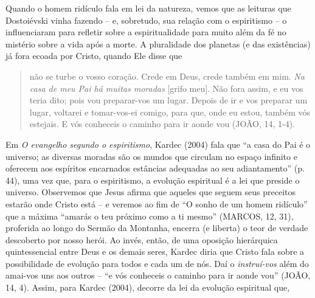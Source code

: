 Quando o homem ridículo fala em lei da natureza, vemos que as leituras
que Dostoiévski vinha fazendo -- e, sobretudo, sua relação com o
espiritismo -- o influenciaram para refletir sobre a espiritualidade
para muito além da fé no mistério sobre a vida após a morte. A
pluralidade dos planetas (e das existências) já fora ecoada por Cristo,
quando Ele disse que

\begin{quote}
não se turbe o vosso coração. Crede em Deus, crede também em mim.
\emph{Na casa de meu Pai há muitas moradas} {[}grifo meu{]}. Não fora
assim, e eu vos teria dito; pois vou preparar-vos um lugar. Depois de ir
e vos preparar um lugar, voltarei e tomar-vos-ei comigo, para que, onde
eu estou, também vós estejais. E vós conheceis o caminho para ir aonde
vou (JOÃO, 14, 1-4).
\end{quote}

Em \emph{O evangelho segundo o espiritismo}, Kardec (2004) fala que ``a
casa do Pai é o universo; as diversas moradas são os mundos que circulam
no espaço infinito e oferecem aos espíritos encarnados estâncias
adequadas ao seu adiantamento'' (p. 44), uma vez que, para o
espiritismo, a evolução espiritual é a lei que preside o universo.
Observemos que Jesus afirma que aqueles que seguem seus preceitos
estarão onde Cristo está -- e veremos ao fim de ``O sonho de um homem
ridículo'' que a máxima ``amarás o teu próximo como a ti mesmo''
(MARCOS, 12, 31), proferida ao longo do Sermão da Montanha, encerra (e
liberta) o teor de verdade descoberto por nosso herói. Ao invés, então,
de uma oposição hierárquica quintessencial entre Deus e os demais seres,
Kardec diria que Cristo fala sobre a possibilidade de evolução para
todos e cada um de nós. Daí o \emph{instruí-vos} além do amai-vos uns
aos outros -- ``e vós conheceis o caminho para ir aonde vou'' (JOÃO, 14,
4). Assim, para Kardec (2004), decorre da lei da evolução espiritual
que,

